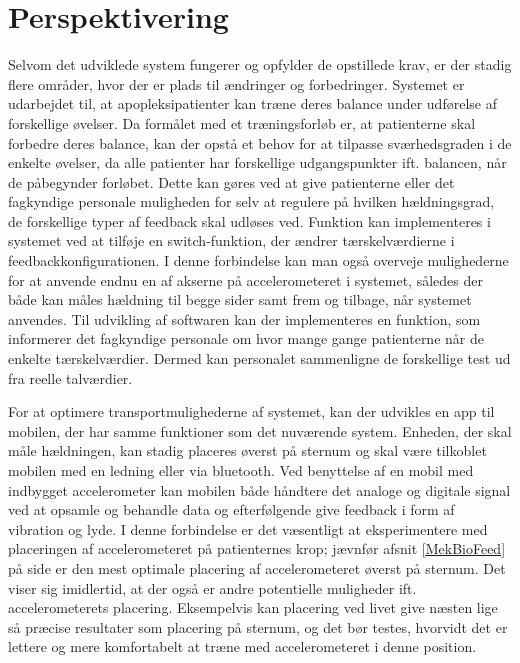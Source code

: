 \section{Perspektivering}
Selvom det udviklede system fungerer og opfylder de opstillede krav, er der stadig flere områder, hvor der er plads til ændringer og forbedringer. 
Systemet er udarbejdet til, at apopleksipatienter kan træne deres balance under udførelse af forskellige øvelser. Da formålet med et træningsforløb er, at patienterne skal forbedre deres balance, kan der opstå et behov for at tilpasse sværhedsgraden i de enkelte øvelser, da alle patienter har forskellige udgangspunkter ift. balancen, når de påbegynder forløbet. Dette kan gøres ved at give patienterne eller det fagkyndige personale muligheden for selv at regulere på hvilken hældningsgrad, de forskellige typer af feedback skal udløses ved. Funktion kan implementeres i systemet ved at tilføje en switch-funktion, der ændrer tærskelværdierne i feedbackkonfigurationen. %
I denne forbindelse kan man også overveje mulighederne for at anvende endnu en af akserne på accelerometeret i systemet, således der både kan måles hældning til begge sider samt frem og tilbage, når systemet anvendes. Til udvikling af softwaren kan der implementeres en funktion, som informerer det fagkyndige personale om hvor mange gange patienterne når de enkelte tærskelværdier. Dermed kan personalet sammenligne de forskellige test ud fra reelle talværdier. 

For at optimere transportmulighederne af systemet, kan der udvikles en app til mobilen, der har samme funktioner som det nuværende system. Enheden, der skal måle hældningen, kan stadig placeres øverst på sternum og skal være tilkoblet mobilen med en ledning eller via bluetooth. Ved benyttelse af en mobil med indbygget accelerometer kan mobilen både håndtere det analoge og digitale signal ved at opsamle og behandle data og efterfølgende give feedback i form af vibration og lyde. %
I denne forbindelse er det væsentligt at eksperimentere med placeringen af accelerometeret på patienternes krop; jævnfør afsnit \ref{MekBioFeed} på side \pageref{MekBioFeed} er den mest optimale placering af accelerometeret øverst på sternum. Det viser sig imidlertid, at der også er andre potentielle muligheder ift. accelerometerets placering. Eksempelvis kan placering ved livet give næsten lige så præcise resultater som placering på sternum, og det bør testes, hvorvidt det er lettere og mere komfortabelt at træne med accelerometeret i denne position\cite{Gjoreski2011}.

